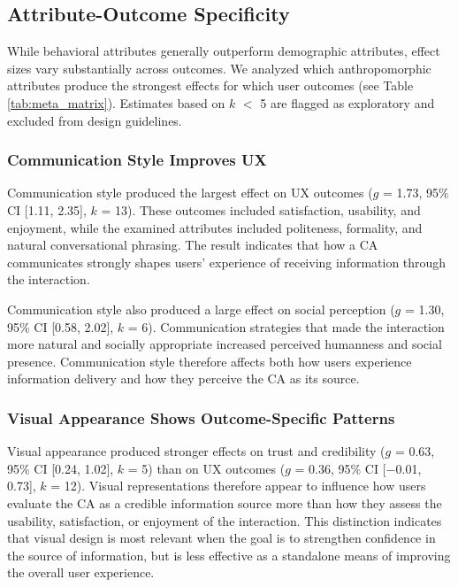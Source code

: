 \documentclass[preprint,review,12pt,authoryear,nonatbib]{elsarticle}
\begin{document}
\subsection{Attribute-Outcome Specificity}

While behavioral attributes generally outperform demographic attributes, effect sizes vary substantially across outcomes. We analyzed which anthropomorphic attributes produce the strongest effects for which user outcomes (see Table \ref{tab:meta_matrix}). Estimates based on $k$ $<$ 5 are flagged as exploratory and excluded from design guidelines.

\subsubsection{Communication Style Improves UX}\label{sec:comm}

Communication style produced the largest effect on UX outcomes ($g$ = 1.73, 95\% CI [1.11, 2.35], $k$ = 13). These outcomes included satisfaction, usability, and enjoyment, while the examined attributes included politeness, formality, and natural conversational phrasing. The result indicates that how a CA communicates strongly shapes users' experience of receiving information through the interaction.

Communication style also produced a large effect on social perception ($g$ = 1.30, 95\% CI [0.58, 2.02], $k$ = 6). Communication strategies that made the interaction more natural and socially appropriate increased perceived humanness and social presence. Communication style therefore affects both how users experience information delivery and how they perceive the CA as its source.

\subsubsection{Visual Appearance Shows Outcome-Specific Patterns}

Visual appearance produced stronger effects on trust and credibility ($g$ = 0.63, 95\% CI [0.24, 1.02], $k$ = 5) than on UX outcomes ($g$ = 0.36, 95\% CI [$-$0.01, 0.73], $k$ = 12). Visual representations therefore appear to influence how users evaluate the CA as a credible information source more than how they assess the usability, satisfaction, or enjoyment of the interaction. This distinction indicates that visual design is most relevant when the goal is to strengthen confidence in the source of information, but is less effective as a standalone means of improving the overall user experience. 
\end{document}
